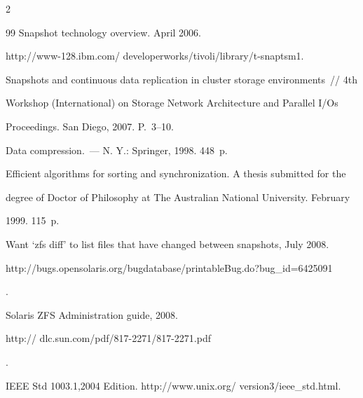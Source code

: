 \begin{multicols}{2}
{{\begin{thebibliography}{99}
Snapshot technology overview. April 2006. 


{\sf http://www-128.ibm.com/ developerworks/tivoli/library/t-snaptsm1}.









Snapshots and continuous data replication in cluster storage environments~// 4th 


Workshop (International) on Storage Network Architecture and Parallel I/Os 


Proceedings. San Diego, 2007. P.~3--10.









Data compression.~---  N. Y.: Springer, 1998. 448~p.









Efficient algorithms for sorting and synchronization. A thesis submitted for the 


degree of Doctor of Philosophy at The Australian National University. February 


1999. 115~p.







Want `zfs diff' to list files that have changed between snapshots, July 2008.   {\sf 


http://bugs.opensolaris.org/\linebreak bugdatabase/printableBug.do?bug\_id=6425091}.





\label{end\stat}







Solaris ZFS Administration guide, 2008. {\sf 


http:// dlc.sun.com/pdf/817-2271/817-2271.pdf}.













IEEE Std 1003.1,2004 Edition. {\sf http://www.unix.org/ version3/ieee\_std.html}.





\end{thebibliography}


}


}


\end{multicols}


   


 


 


 


 


